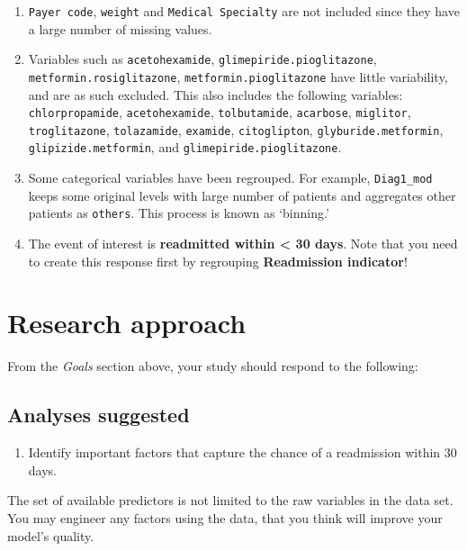 \documentclass[
]{article}
\providecommand{\tightlist}{%
  \setlength{\itemsep}{0pt}\setlength{\parskip}{0pt}}
\begin{document}
\begin{enumerate}
\def\labelenumi{\arabic{enumi})}
\item
  \texttt{Payer\ code}, \texttt{weight} and \texttt{Medical\ Specialty}
  are not included since they have a large number of missing values.
\item
  Variables such as \texttt{acetohexamide},
  \texttt{glimepiride.pioglitazone}, \texttt{metformin.rosiglitazone},
  \texttt{metformin.pioglitazone} have little variability, and are as
  such excluded. This also includes the following variables:
  \texttt{chlorpropamide}, \texttt{acetohexamide}, \texttt{tolbutamide},
  \texttt{acarbose}, \texttt{miglitor}, \texttt{troglitazone},
  \texttt{tolazamide}, \texttt{examide}, \texttt{citoglipton},
  \texttt{glyburide.metformin}, \texttt{glipizide.metformin}, and
  \texttt{glimepiride.pioglitazone}.
\item
  Some categorical variables have been regrouped. For example,
  \texttt{Diag1\_mod} keeps some original levels with large number of
  patients and aggregates other patients as \texttt{others}. This
  process is known as `binning.'
\item
  The event of interest is \textbf{readmitted within \textless{} 30
  days}. Note that you need to create this response first by regrouping
  \textbf{Readmission indicator}!
\end{enumerate}

\hypertarget{research-approach}{%
\section{Research approach}\label{research-approach}}

From the \emph{Goals} section above, your study should respond to the
following:

\hypertarget{analyses-suggested}{%
\subsection{Analyses suggested}\label{analyses-suggested}}

\begin{enumerate}
\def\labelenumi{\arabic{enumi})}
\tightlist
\item
  Identify important factors that capture the chance of a readmission
  within 30 days.
\end{enumerate}

The set of available predictors is not limited to the raw variables in
the data set. You may engineer any factors using the data, that you
think will improve your model's quality.
\end{document}
